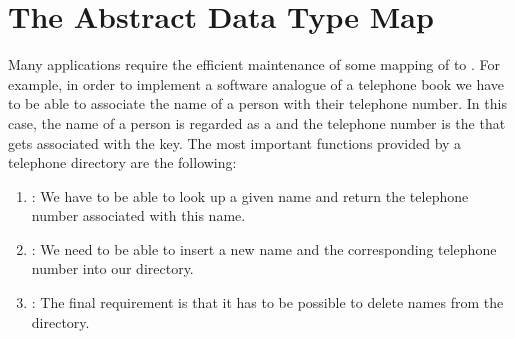 \section{The Abstract Data Type Map} 
Many applications require the efficient maintenance of some mapping of  to
.  For example, in order to implement a software analogue of a telephone book we have to
be able to associate the name of a person with their telephone number.  In this case, the name of a person is
regarded as a  and the telephone number is the  that gets associated with the key.
The most important functions provided by a telephone directory are the following:
\begin{enumerate}
\item {}: We have to be able to look up a given name and return the telephone number
      associated with this name.
\item {}: We need to be able to insert a new name and the corresponding telephone
      number into our directory.
\item {}: The final requirement is that it has to be possible to delete names from
      the directory.
\end{enumerate}



